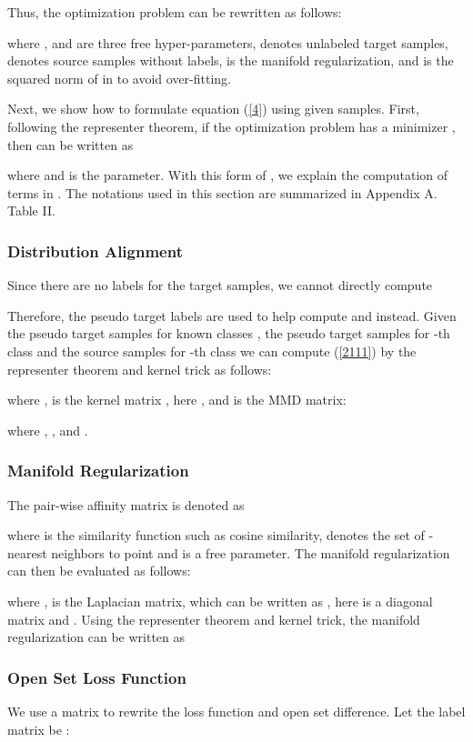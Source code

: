 \documentclass[journal]{IEEEtran}
\begin{document}
Thus, the optimization problem can be rewritten as follows: 

where ,  and  are three free hyper-parameters,  denotes unlabeled target samples,  denotes source samples without labels,  is the manifold regularization, and  is the squared norm of  in  to avoid over-fitting. 


Next, we show how to formulate equation (\ref{4}) using given samples. First, 
following the representer theorem, if the optimization problem  has a minimizer , then  can be written as 

where  and  is the parameter. With this form of , we explain the computation of terms in . The notations used in this section are summarized in Appendix A. Table II.


\subsubsection{Distribution Alignment} 

Since there are no labels for the target samples, we cannot directly compute 

Therefore, the pseudo target labels are used to help compute  and  instead.
Given the pseudo target samples for known classes , the pseudo target samples for -th class  and the source samples for -th class 
we can compute (\ref{2111}) by  the representer theorem and kernel trick as follows:

where ,  is the  kernel matrix , here , and  is the MMD matrix:





where , ,  and .
 

\subsubsection{Manifold Regularization}
 The pair-wise affinity matrix is denoted as 
 
 where  is the similarity function such as cosine similarity,  denotes the set of -nearest neighbors to point  and  is a free parameter.
The manifold regularization can then be evaluated as follows:

where ,  is the  Laplacian matrix, which can be written as , here  is a diagonal matrix and . Using the representer theorem and kernel trick, the manifold  regularization  can be written as


\subsubsection{Open Set Loss Function} We use a matrix to rewrite the loss function and open set difference. Let the label matrix be 
:
\end{document}
